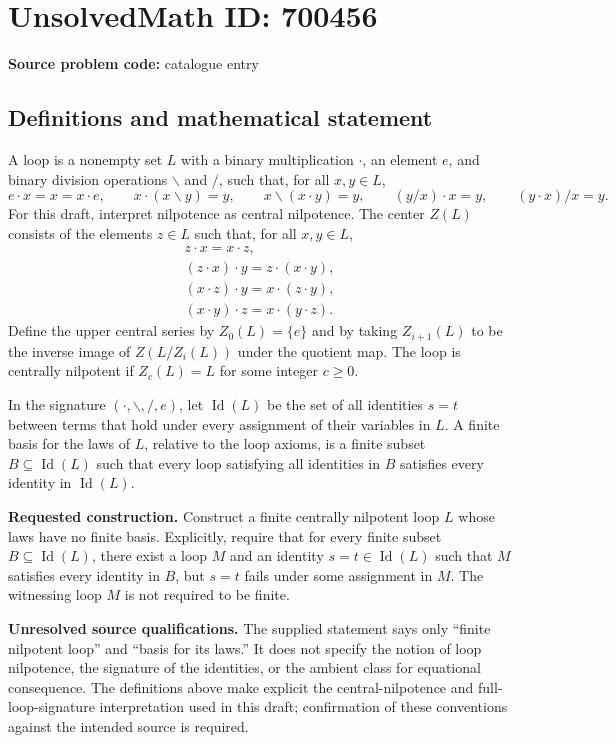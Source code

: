 \documentclass[11pt]{article}
\begin{document}
\section*{UnsolvedMath ID: 700456}
\textbf{Source problem code:} catalogue entry
\subsection{Definitions and mathematical statement}
A loop is a nonempty set \(L\) with a binary multiplication \(\cdot\), an element \(e\), and binary division operations \(\backslash\) and \(/\), such that, for all \(x,y\in L\),
\[
e\cdot x=x=x\cdot e,\qquad x\cdot(x\backslash y)=y,\qquad x\backslash(x\cdot y)=y,\qquad (y/x)\cdot x=y,\qquad (y\cdot x)/x=y.
\]
For this draft, interpret nilpotence as central nilpotence. The center \(Z(L)\) consists of the elements \(z\in L\) such that, for all \(x,y\in L\),
\[
\begin{gathered}
z\cdot x=x\cdot z,\\
(z\cdot x)\cdot y=z\cdot(x\cdot y),\\
(x\cdot z)\cdot y=x\cdot(z\cdot y),\\
(x\cdot y)\cdot z=x\cdot(y\cdot z).
\end{gathered}
\]
Define the upper central series by \(Z_0(L)=\{e\}\) and by taking \(Z_{i+1}(L)\) to be the inverse image of \(Z(L/Z_i(L))\) under the quotient map. The loop is centrally nilpotent if \(Z_c(L)=L\) for some integer \(c\geq 0\).

In the signature \((\cdot,\backslash,/,e)\), let \(\operatorname{Id}(L)\) be the set of all identities \(s=t\) between terms that hold under every assignment of their variables in \(L\). A finite basis for the laws of \(L\), relative to the loop axioms, is a finite subset \(B\subseteq\operatorname{Id}(L)\) such that every loop satisfying all identities in \(B\) satisfies every identity in \(\operatorname{Id}(L)\).

\textbf{Requested construction.} Construct a finite centrally nilpotent loop \(L\) whose laws have no finite basis. Explicitly, require that for every finite subset \(B\subseteq\operatorname{Id}(L)\), there exist a loop \(M\) and an identity \(s=t\in\operatorname{Id}(L)\) such that \(M\) satisfies every identity in \(B\), but \(s=t\) fails under some assignment in \(M\). The witnessing loop \(M\) is not required to be finite.

\textbf{Unresolved source qualifications.} The supplied statement says only ``finite nilpotent loop'' and ``basis for its laws.'' It does not specify the notion of loop nilpotence, the signature of the identities, or the ambient class for equational consequence. The definitions above make explicit the central-nilpotence and full-loop-signature interpretation used in this draft; confirmation of these conventions against the intended source is required.
\end{document}
